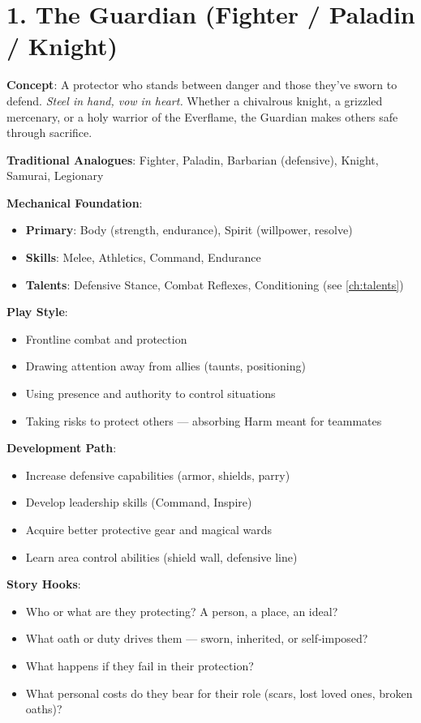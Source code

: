 \section{1. The Guardian (Fighter / Paladin / Knight)}
\label{sec:concept-guardian}

\textbf{Concept}: A protector who stands between danger and those they've sworn to defend. \emph{Steel in hand, vow in heart.} Whether a chivalrous knight, a grizzled mercenary, or a holy warrior of the Everflame, the Guardian makes others safe through sacrifice.

\textbf{Traditional Analogues}: Fighter, Paladin, Barbarian (defensive), Knight, Samurai, Legionary

\textbf{Mechanical Foundation}:
\begin{itemize}
\item \textbf{Primary}: Body (strength, endurance), Spirit (willpower, resolve)
\item \textbf{Skills}: Melee, Athletics, Command, Endurance
\item \textbf{Talents}: Defensive Stance, Combat Reflexes, Conditioning (see \ref{ch:talents})
\end{itemize}

\textbf{Play Style}:
\begin{itemize}
\item Frontline combat and protection
\item Drawing attention away from allies (taunts, positioning)
\item Using presence and authority to control situations
\item Taking risks to protect others — absorbing Harm meant for teammates
\end{itemize}

\textbf{Development Path}:
\begin{itemize}
\item Increase defensive capabilities (armor, shields, parry)
\item Develop leadership skills (Command, Inspire)
\item Acquire better protective gear and magical wards
\item Learn area control abilities (shield wall, defensive line)
\end{itemize}

\textbf{Story Hooks}:
\begin{itemize}
\item Who or what are they protecting? A person, a place, an ideal?
\item What oath or duty drives them — sworn, inherited, or self‑imposed?
\item What happens if they fail in their protection?
\item What personal costs do they bear for their role (scars, lost loved ones, broken oaths)?
\end{itemize}

